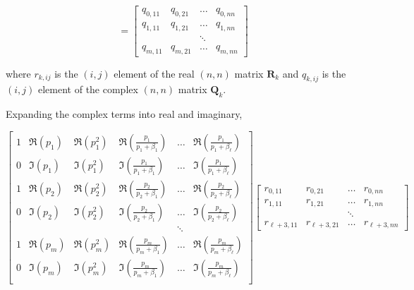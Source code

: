 \documentclass[11pt]{article}
\newcommand{\Matrix}[1]{\boldsymbol{#1}}
\begin{document}
\begin{equation}
 =
\left[
\begin{array}{cccc}
q_{0,11}   & q_{0,21}   & \ldots & q_{0,nn} \\
q_{1,11}   & q_{1,21}   & \ldots & q_{1,nn} \\
           &            & \ddots &          \\
q_{m,11}   & q_{m,21}   & \ldots & q_{m,nn}
\end{array}
\right]
\end{equation}

where
$r_{k,ij}$
is the $(i,j)$
element of the real
$(n,n)$
matrix $\Matrix{R}_k$
and $q_{k,ij}$
is the
$(i,j)$
element of the complex
$(n,n)$
matrix $\Matrix{Q}_k$.

\par
Expanding the complex terms into real and imaginary,

\begin{displaymath}
\left[
\begin{array}{cccccc}
1 & \Re(p_1) & \Re(p_1^2) & \Re(\frac{p_1}{p_1 + \beta_1}) & \ldots & \Re(\frac{p_1}{p_1 + \beta_{\ell}}) \\
0 & \Im(p_1) & \Im(p_1^2) & \Im(\frac{p_1}{p_1 + \beta_1}) & \ldots & \Im(\frac{p_1}{p_1 + \beta_{\ell}}) \\
1 & \Re(p_2) & \Re(p_2^2) & \Re(\frac{p_2}{p_2 + \beta_1}) & \ldots & \Re(\frac{p_2}{p_2 + \beta_{\ell}}) \\
0 & \Im(p_2) & \Im(p_2^2) & \Im(\frac{p_2}{p_2 + \beta_1}) & \ldots & \Im(\frac{p_2}{p_2 + \beta_{\ell}}) \\
  &          &            &                                & \ddots &                           \\
1 & \Re(p_m) & \Re(p_m^2) & \Re(\frac{p_m}{p_m + \beta_1}) & \ldots & \Re(\frac{p_m}{p_m + \beta_{\ell}}) \\
0 & \Im(p_m) & \Im(p_m^2) & \Im(\frac{p_m}{p_m + \beta_1}) & \ldots & \Im(\frac{p_m}{p_m + \beta_{\ell}}) \\
\end{array}
\right]
\left[
\begin{array}{cccc}
r_{0,11}   & r_{0,21}   & \ldots & r_{0,nn} \\
r_{1,11}   & r_{1,21}   & \ldots & r_{1,nn} \\
           &            & \ddots &          \\
r_{\ell+3,11} & r_{\ell+3,21} & \ldots & r_{\ell+3,nn}
\end{array}
\right]
\end{displaymath}
\end{document}

